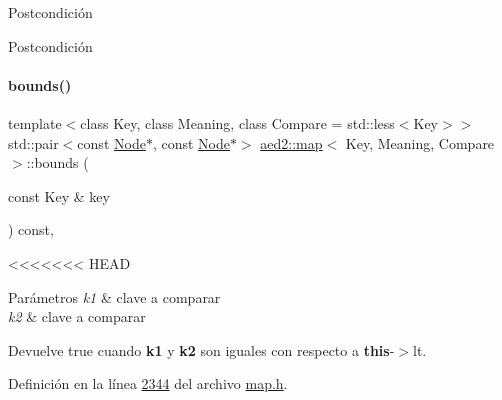 \begin{DoxyPostcond}{\-Postcondición}
\begin{DoxyPostcond}{\-Postcondición}
\paragraph{\texorpdfstring{bounds()}{bounds()}\hspace{0.1cm}{\footnotesize\ttfamily [2/2]}}
{\footnotesize\ttfamily template$<$class Key, class Meaning, class Compare = std\+::less$<$\+Key$>$$>$ \\
std\+::pair$<$const \hyperlink{structaed2_1_1map_1_1Node}{Node}$\ast$, const \hyperlink{structaed2_1_1map_1_1Node}{Node}$\ast$$>$ \hyperlink{classaed2_1_1map}{aed2\+::map}$<$ Key, Meaning, Compare $>$\+::bounds (\begin{DoxyParamCaption}\item[{const Key \&}]{key }\end{DoxyParamCaption}) const\hspace{0.3cm}{\ttfamily [inline]}, {\ttfamily [private]}}

<<<<<<< HEAD
\begin{DoxyParams}{\-Parámetros}
{\em k1} & clave a comparar \\
\hline
{\em k2} & clave a comparar \\
\hline
\end{DoxyParams}
\begin{DoxyReturn}{\-Devuelve}
true cuando {\bfseries k1} y {\bfseries k2} son iguales con respecto a {\bfseries this}-\/$>$lt. 
\end{DoxyReturn}


\-Definición en la línea \hyperlink{map_8h_source_l02344}{2344} del archivo \hyperlink{map_8h_source}{map.\-h}.

\hypertarget{classaed2_1_1map_a45b04533e9acf27438813ab4a2604443_a45b04533e9acf27438813ab4a2604443}{
}
\end{DoxyPostcond}
\end{DoxyPostcond}
